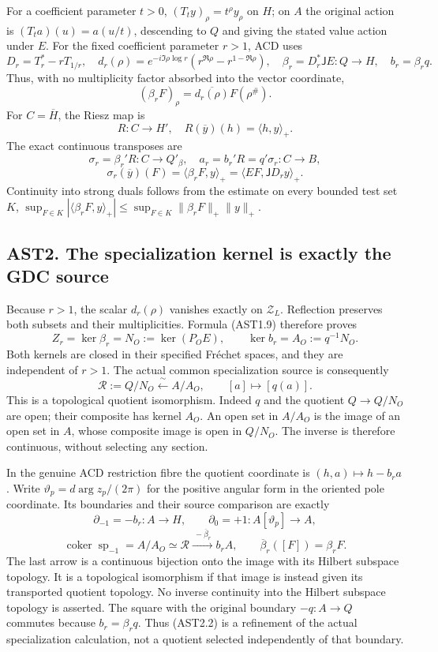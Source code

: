 For a coefficient parameter \(t>0\), \((T_ty)_\rho=t^\rho y_\rho\) on
\(H\); on \(A\) the original action is \((T_ta)(u)=a(u/t)\), descending
to \(Q\) and giving the stated value action under \(E\). For the fixed
coefficient parameter \(r>1\), ACD uses \[
D_r=T_r^*-rT_{1/r},\quad
d_r(\rho)=e^{-i\Im\rho\log r}
(r^{\Re\rho}-r^{1-\Re\rho}),\quad
\beta_r=D_r^*\mathsf JE:Q\to H,\quad b_r=\beta_rq.
\tag{AST1.8}
\] Thus, with no multiplicity factor absorbed into the vector
coordinate, \[
(\beta_rF)_\rho=\overline{d_r(\rho)}F(\rho^\#).
\tag{AST1.9}
\] For \(C=\overline H\), the Riesz map is \[
R:C\to H',\quad R(\overline y)(h)=\langle h,y\rangle_+.
\] The exact continuous transposes are \[
\sigma_r=\beta_r'R:C\to Q'_\beta,\quad
a_r=b_r'R=q'\sigma_r:C\to B,
\] \[
\sigma_r(\overline y)(F)=\langle\beta_rF,y\rangle_+
=\langle EF,\mathsf JD_ry\rangle_+.
\tag{AST1.10}
\] Continuity into strong duals follows from the estimate on every
bounded test set \(K\), \(\sup_{F\in K}|\langle\beta_rF,y\rangle_+|
\le\sup_{F\in K}\|\beta_rF\|_+\|y\|_+\).

\subsection{AST2. The specialization kernel is exactly the GDC
source}\label{ast2.-the-specialization-kernel-is-exactly-the-gdc-source}

Because \(r>1\), the scalar \(d_r(\rho)\) vanishes exactly on
\(\mathscr Z_L\). Reflection preserves both subsets and their
multiplicities. Formula (AST1.9) therefore proves \[
\boxed{Z_r=\ker\beta_r=N_O:=\ker(P_OE),\qquad
\ker b_r=A_O:=q^{-1}N_O.}
\tag{AST2.1}
\] Both kernels are closed in their specified Fréchet spaces, and they
are independent of \(r>1\). The actual common specialization source is
consequently \[
\mathcal R:=Q/N_O\xleftarrow{\ \sim\ }A/A_O,
\qquad [a]\longmapsto[q(a)].
\tag{AST2.2}
\] This is a topological quotient isomorphism. Indeed \(q\) and the
quotient \(Q\to Q/N_O\) are open; their composite has kernel \(A_O\). An
open set in \(A/A_O\) is the image of an open set in \(A\), whose
composite image is open in \(Q/N_O\). The inverse is therefore
continuous, without selecting any section.

In the genuine ACD restriction fibre the quotient coordinate is
\((h,a)\mapsto h-b_ra\). Write \(\vartheta_p=d\arg z_p/(2\pi)\) for the
positive angular form in the oriented pole coordinate. Its boundaries
and their source comparison are exactly \[
\partial_{-1}=-b_r:A\to H,\qquad
\partial_0=+1:A[\vartheta_p]\to A,
\] \[
\operatorname{coker}\operatorname{sp}_{-1}
=A/A_O\simeq\mathcal R
\xrightarrow{\ -\overline\beta_r\ }b_rA,\qquad
\overline\beta_r([F])=\beta_rF.
\tag{AST2.3}
\] The last arrow is a continuous bijection onto the image with its
Hilbert subspace topology. It is a topological isomorphism if that image
is instead given its transported quotient topology. No inverse
continuity into the Hilbert subspace topology is asserted. The square
with the original boundary \(-q:A\to Q\) commutes because
\(b_r=\beta_rq\). Thus (AST2.2) is a refinement of the actual
specialization calculation, not a quotient selected independently of
that boundary.

